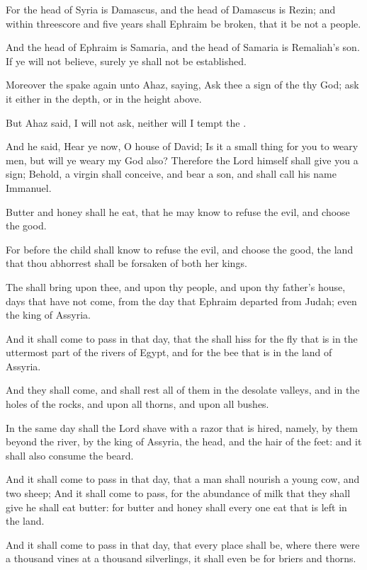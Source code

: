 \verse For the head of Syria is Damascus, and the head of Damascus is Rezin; and within threescore and five years shall Ephraim be broken, that it be not a people.

\verse And the head of Ephraim is Samaria, and the head of Samaria is Remaliah's son. If ye will not believe, surely ye shall not be established.

\verse Moreover the \LORD spake again unto Ahaz, saying, \verse Ask thee a sign of the \LORD thy God; ask it either in the depth, or in the height above.

\verse But Ahaz said, I will not ask, neither will I tempt the \LORD.

\verse And he said, Hear ye now, O house of David; Is it a small thing for you to weary men, but will ye weary my God also?  \verse Therefore the Lord himself shall give you a sign; Behold, a virgin shall conceive, and bear a son, and shall call his name Immanuel.

\verse Butter and honey shall he eat, that he may know to refuse the evil, and choose the good.

\verse For before the child shall know to refuse the evil, and choose the good, the land that thou abhorrest shall be forsaken of both her kings.

\verse The \LORD shall bring upon thee, and upon thy people, and upon thy father's house, days that have not come, from the day that Ephraim departed from Judah; even the king of Assyria.

\verse And it shall come to pass in that day, that the \LORD shall hiss for the fly that is in the uttermost part of the rivers of Egypt, and for the bee that is in the land of Assyria.

\verse And they shall come, and shall rest all of them in the desolate valleys, and in the holes of the rocks, and upon all thorns, and upon all bushes.

\verse In the same day shall the Lord shave with a razor that is hired, namely, by them beyond the river, by the king of Assyria, the head, and the hair of the feet: and it shall also consume the beard.

\verse And it shall come to pass in that day, that a man shall nourish a young cow, and two sheep; \verse And it shall come to pass, for the abundance of milk that they shall give he shall eat butter: for butter and honey shall every one eat that is left in the land.

\verse And it shall come to pass in that day, that every place shall be, where there were a thousand vines at a thousand silverlings, it shall even be for briers and thorns.

